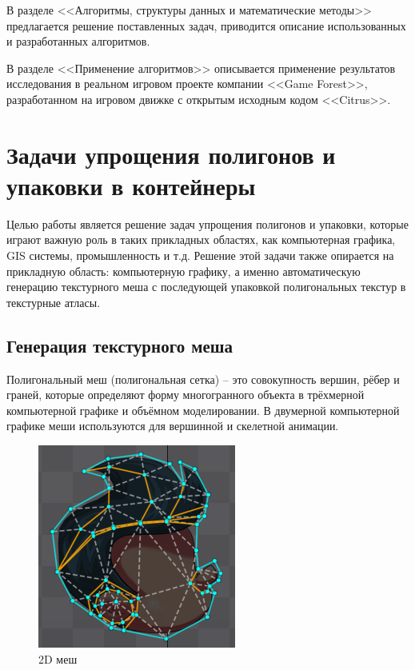\documentclass{fefu_thesis/cls/fefu}
\begin{document}
    В разделе <<Алгоритмы, структуры данных и математические методы>> предлагается решение поставленных задач, приводится описание использованных и разработанных алгоритмов.

    В разделе <<Применение алгоритмов>> описывается применение результатов исследования в реальном игровом проекте компании <<Game Forest>>, разработанном на игровом движке с открытым исходным кодом <<Citrus>>.

    \pagebreak
    \section{Задачи упрощения полигонов и упаковки в контейнеры}

    Целью работы является решение задач упрощения полигонов и упаковки, которые играют важную роль в таких прикладных областях, как компьютерная графика, GIS системы, промышленность и т.д. Решение этой задачи также опирается на прикладную область: компьютерную графику, а именно автоматическую генерацию текстурного меша с последующей упаковкой полигональных текстур в текстурные атласы.

    \subsection{Генерация текстурного меша}
    \label{TextureMeshGeneration}
    Полигональный меш (полигональная сетка) -- это совокупность вершин, рёбер и граней, которые определяют форму многогранного объекта в трёхмерной компьютерной графике и объёмном моделировании. В двумерной компьютерной графике меши используются для вершинной и скелетной анимации.

    \begin{figure}[H]
        \centering
        \includegraphics[scale=0.5]{images/spine_mesh.png}
        \caption{2D меш}
    \end{figure}
\end{document}
